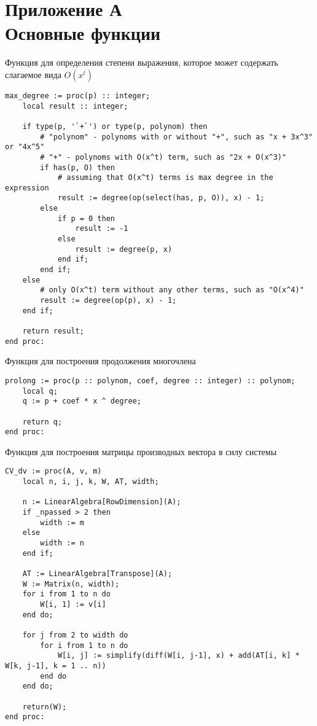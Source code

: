 \section*{Приложение А \\ Основные функции}


Функция для определения степени выражения, которое может содержать слагаемое вида $O(x^t)$
\begin{lstlisting}[basicstyle=\scriptsize]
max_degree := proc(p) :: integer;
    local result :: integer;
    
    if type(p, '`+`') or type(p, polynom) then
        # "polynom" - polynoms with or without "+", such as "x + 3x^3" or "4x^5"
        # "+" - polynoms with O(x^t) term, such as "2x + O(x^3)"
        if has(p, O) then
            # assuming that O(x^t) terms is max degree in the expression
            result := degree(op(select(has, p, O)), x) - 1;
        else
            if p = 0 then
                result := -1
            else
                result := degree(p, x)
            end if;
        end if;
    else
        # only O(x^t) term without any other terms, such as "O(x^4)"
        result := degree(op(p), x) - 1;
    end if;
    
    return result;
end proc:
\end{lstlisting}


\bigskip
Функция для построения продолжения многочлена
\begin{lstlisting}[basicstyle=\scriptsize]
prolong := proc(p :: polynom, coef, degree :: integer) :: polynom;
    local q;
    q := p + coef * x ^ degree;
    
    return q;
end proc:
\end{lstlisting}


\newpage
Функция для построения матрицы производных вектора в силу системы
\begin{lstlisting}[basicstyle=\scriptsize]
CV_dv := proc(A, v, m)
    local n, i, j, k, W, AT, width;
    
    n := LinearAlgebra[RowDimension](A);
    if _npassed > 2 then
        width := m
    else
        width := n
    end if;
    
    AT := LinearAlgebra[Transpose](A);
    W := Matrix(n, width);
    for i from 1 to n do
        W[i, 1] := v[i]
    end do;
    
    for j from 2 to width do
        for i from 1 to n do
            W[i, j] := simplify(diff(W[i, j-1], x) + add(AT[i, k] * W[k, j-1], k = 1 .. n))
        end do
    end do;
    
    return(W);
end proc:
\end{lstlisting}


